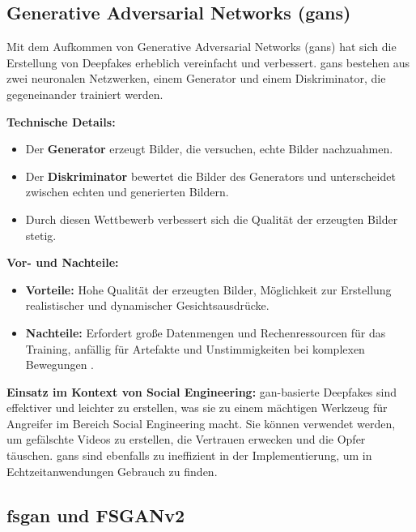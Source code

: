 \subsection{Generative Adversarial Networks (\glspl{gan})}\label{subsec:gans}

Mit dem Aufkommen von Generative Adversarial Networks (\glspl{gan}) hat sich die Erstellung von Deepfakes erheblich vereinfacht und verbessert.
\glspl{gan} bestehen aus zwei neuronalen Netzwerken, einem Generator und einem Diskriminator, die gegeneinander trainiert werden.\cite{Deepfakes-a-survey-and-introduction-to-the-topical-collection}

\textbf{Technische Details:}
\begin{itemize}
    \item Der \textbf{Generator} erzeugt Bilder, die versuchen, echte Bilder nachzuahmen.
    \item Der \textbf{Diskriminator} bewertet die Bilder des Generators und unterscheidet zwischen echten und generierten Bildern.
    \item Durch diesen Wettbewerb verbessert sich die Qualität der erzeugten Bilder stetig.
\end{itemize}

\textbf{Vor- und Nachteile:}
\begin{itemize}
    \item \textbf{Vorteile:} Hohe Qualität der erzeugten Bilder, Möglichkeit zur Erstellung realistischer und dynamischer Gesichtsausdrücke.
    \item \textbf{Nachteile:} Erfordert große Datenmengen und Rechenressourcen für das Training, anfällig für Artefakte und Unstimmigkeiten bei komplexen Bewegungen \cite{Deepfakes-An-Overview}.
\end{itemize}

\textbf{Einsatz im Kontext von Social Engineering:} \gls{gan}-basierte Deepfakes sind effektiver und leichter zu erstellen, was sie zu einem mächtigen Werkzeug für Angreifer im Bereich Social Engineering macht.
Sie können verwendet werden, um gefälschte Videos zu erstellen, die Vertrauen erwecken und die Opfer täuschen.
\glspl{gan} sind ebenfalls zu ineffizient in der Implementierung, um in Echtzeitanwendungen Gebrauch zu finden.

\subsection{\gls{fsgan} und FSGANv2}\label{subsec:fsgan}

